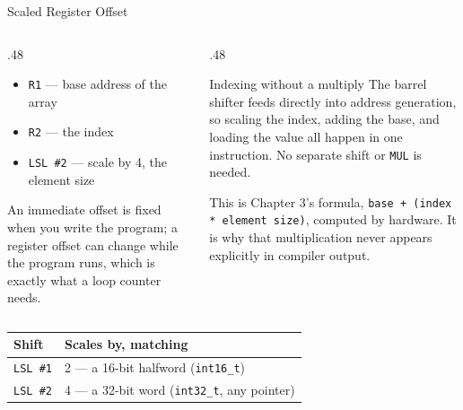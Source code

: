 \documentclass[9pt,aspectratio=169,xcolor=table]{beamer}
\begin{document}
\begin{frame}[fragile]{Scaled Register Offset}
	\begin{columns}[T]
		\begin{column}{.48\textwidth}

			\vspace{3mm}
			{\small
				\begin{itemize}\itemsep1pt
					\item \texttt{R1} --- base address of the array
					\item \texttt{R2} --- the index
					\item \texttt{LSL \#2} --- scale by 4, the element size
			\end{itemize}}

			\vspace{2mm}
			{\small An immediate offset is fixed when you write the
				program; a register offset can change \alert{while the
					program runs}, which is exactly what a loop counter needs.}
		\end{column}
		\begin{column}{.48\textwidth}
			\begin{block}{Indexing without a multiply}
				The barrel shifter feeds directly into address generation,
				so scaling the index, adding the base, and loading the value
				all happen in \alert{one instruction}. No separate shift or
				\texttt{MUL} is needed.

				\vspace{2mm}
				This is Chapter 3's formula, \texttt{base + (index * element size)},
				computed by hardware. It is why that multiplication never
				appears explicitly in compiler output.
			\end{block}
		\end{column}
	\end{columns}

	\vspace{3mm}
	\begin{center}
		{\small
			\begin{tabular}{@{}l l@{}}
				\toprule
				\textbf{Shift} & \textbf{Scales by, matching} \\
				\midrule
				\texttt{LSL \#1} & 2 --- a 16-bit halfword (\texttt{int16\_t}) \\
				\texttt{LSL \#2} & 4 --- a 32-bit word (\texttt{int32\_t}, any pointer) \\
				\bottomrule
		\end{tabular}}
	\end{center}
\end{frame}
\end{document}
